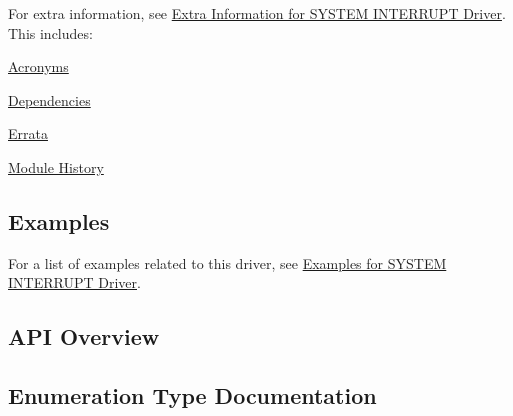 For extra information, see \hyperlink{asfdoc_sam0_system_interrupt_extra}{Extra Information for S\+Y\+S\+T\+E\+M I\+N\+T\+E\+R\+R\+U\+P\+T Driver}. This includes\+:
\begin{DoxyItemize}
\item \hyperlink{asfdoc_sam0_system_interrupt_extra_asfdoc_sam0_system_interrupt_extra_acronyms}{Acronyms}
\item \hyperlink{asfdoc_sam0_system_interrupt_extra_asfdoc_sam0_system_interrupt_extra_dependencies}{Dependencies}
\item \hyperlink{asfdoc_sam0_system_interrupt_extra_asfdoc_sam0_system_interrupt_extra_errata}{Errata}
\item \hyperlink{asfdoc_sam0_system_interrupt_extra_asfdoc_sam0_system_interrupt_extra_history}{Module History}
\end{DoxyItemize}\hypertarget{group__asfdoc__sam0__system__interrupt__group_asfdoc_sam0_system_interrupt_examples}{}\subsection{Examples}\label{group__asfdoc__sam0__system__interrupt__group_asfdoc_sam0_system_interrupt_examples}
For a list of examples related to this driver, see \hyperlink{asfdoc_sam0_system_interrupt_exqsg}{Examples for S\+Y\+S\+T\+E\+M I\+N\+T\+E\+R\+R\+U\+P\+T Driver}.\hypertarget{group__asfdoc__sam0__system__interrupt__group_asfdoc_sam0_system_interrupt_api_overview}{}\subsection{A\+P\+I Overview}\label{group__asfdoc__sam0__system__interrupt__group_asfdoc_sam0_system_interrupt_api_overview}


\subsection{Enumeration Type Documentation}
\hypertarget{group__asfdoc__sam0__system__interrupt__group_ga6d21907577ff204de7f5fa4642c84589}{}
